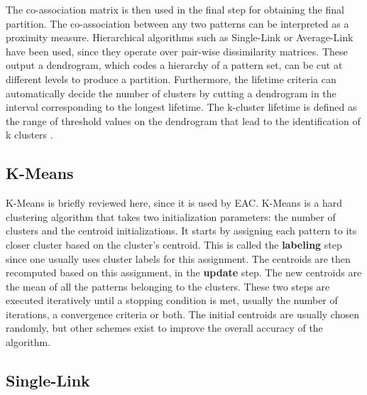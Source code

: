 The co-association matrix is then used in the final step for obtaining the final partition.
The co-association between any two patterns can be interpreted as a proximity measure.
Hierarchical algorithms such as Single-Link or Average-Link have been used, since they operate over pair-wise dissimilarity matrices.
These output a dendrogram, which codes a hierarchy of a pattern set, can be cut at different levels to produce a partition.
Furthermore, the lifetime criteria can automatically decide the number of clusters by cutting a dendrogram in the interval corresponding to the longest lifetime.
The k-cluster lifetime is defined as the range of threshold values on the dendrogram that lead to the identification of k clusters \cite{Fred2005}.

\subsection{K-Means}

K-Means is briefly reviewed here, since it is used by EAC.
K-Means is a hard clustering algorithm that takes two initialization parameters: the number of clusters and the centroid initializations.
It starts by assigning each pattern to its closer cluster based on the cluster's centroid.
This is called the \textbf{labeling} step since one usually uses cluster labels for this assignment.
The centroids are then recomputed based on this assignment, in the \textbf{update} step.
The new centroids are the mean of all the patterns belonging to the clusters. %
These two steps are executed iteratively until a stopping condition is met, usually the number of iterations, a convergence criteria or both.
The initial centroids are usually chosen randomly, but other schemes exist to improve the overall accuracy of the algorithm. %

\subsection{Single-Link}

